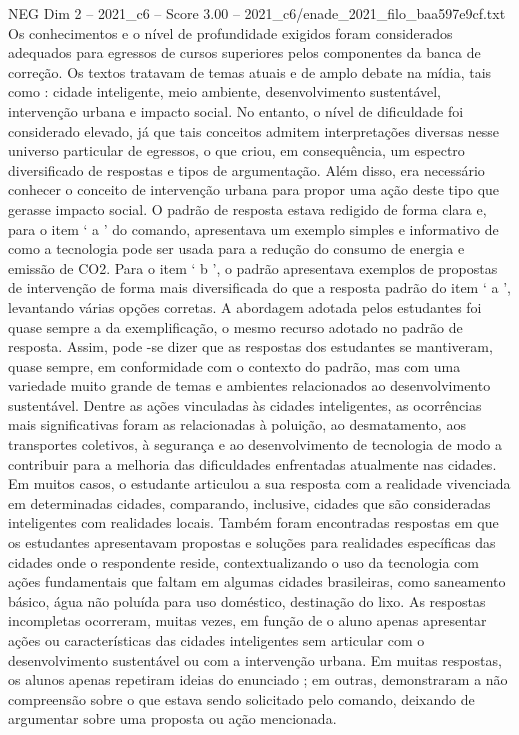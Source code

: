 \begin{textsample}{NEG Dim 2 – 2021\_c6 – Score 3.00 – 2021\_c6/enade\_2021\_filo\_baa597e9cf.txt}
Os conhecimentos e o nível de profundidade exigidos foram considerados adequados para egressos de cursos superiores pelos componentes da banca de correção.
Os textos tratavam de temas atuais e de amplo debate na mídia, tais como : cidade inteligente, meio ambiente, desenvolvimento sustentável, intervenção urbana e impacto social.
No entanto, o nível de dificuldade foi considerado elevado, já que tais conceitos admitem interpretações diversas nesse universo particular de egressos, o que criou, em consequência, um espectro diversificado de respostas e tipos de argumentação.
Além disso, era necessário conhecer o conceito de intervenção urbana para propor uma ação deste tipo que gerasse impacto social.
O padrão de resposta estava redigido de forma clara e, para o item ‘ a ’ do comando, apresentava um exemplo simples e informativo de como a tecnologia pode ser usada para a redução do consumo de energia e emissão de CO2.
Para o item ‘ b ’, o padrão apresentava exemplos de propostas de intervenção de forma mais diversificada do que a resposta padrão do item ‘ a ’, levantando várias opções corretas.
A abordagem adotada pelos estudantes foi quase sempre a da exemplificação, o mesmo recurso adotado no padrão de resposta.
Assim, pode -se dizer que as respostas dos estudantes se mantiveram, quase sempre, em conformidade com o contexto do padrão, mas com uma variedade muito grande de temas e ambientes relacionados ao desenvolvimento sustentável.
Dentre as ações vinculadas às cidades inteligentes, as ocorrências mais significativas foram as relacionadas à poluição, ao desmatamento, aos transportes coletivos, à segurança e ao desenvolvimento de tecnologia de modo a contribuir para a melhoria das dificuldades enfrentadas atualmente nas cidades.
Em muitos casos, o estudante articulou a sua resposta com a realidade vivenciada em determinadas cidades, comparando, inclusive, cidades que são consideradas inteligentes com realidades locais.
Também foram encontradas respostas em que os estudantes apresentavam propostas e soluções para realidades específicas das cidades onde o respondente reside, contextualizando o uso da tecnologia com ações fundamentais que faltam em algumas cidades brasileiras, como saneamento básico, água não poluída para uso doméstico, destinação do lixo.
As respostas incompletas ocorreram, muitas vezes, em função de o aluno apenas apresentar ações ou características das cidades inteligentes sem articular com o desenvolvimento sustentável ou com a intervenção urbana.
Em muitas respostas, os alunos apenas repetiram ideias do enunciado ; em outras, demonstraram a não compreensão sobre o que estava sendo solicitado pelo comando, deixando de argumentar sobre uma proposta ou ação mencionada.

\end{textsample}
